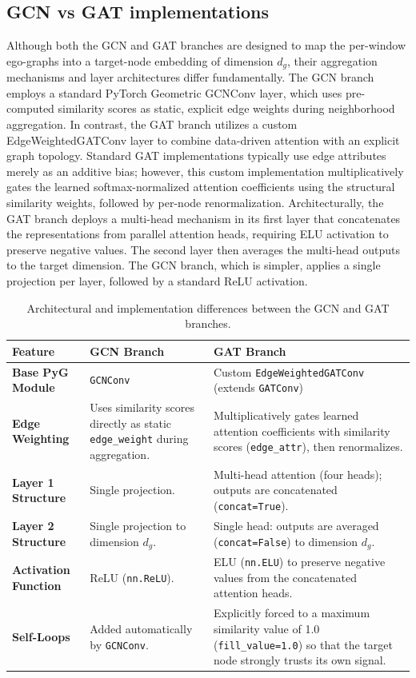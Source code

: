 \subsection{GCN vs GAT implementations}
Although both the GCN and GAT branches are designed to map the per-window ego-graphs into a target-node embedding of dimension $d_g$, their aggregation mechanisms and layer architectures differ fundamentally. The GCN branch employs a standard PyTorch Geometric GCNConv layer, which uses pre-computed similarity scores as static, explicit edge weights during neighborhood aggregation. In contrast, the GAT branch utilizes a custom EdgeWeightedGATConv layer to combine data-driven attention with an explicit graph topology. Standard GAT implementations typically use edge attributes merely as an additive bias; however, this custom implementation multiplicatively gates the learned softmax-normalized attention coefficients using the structural similarity weights, followed by per-node renormalization. Architecturally, the GAT branch deploys a multi-head mechanism in its first layer that concatenates the representations from parallel attention heads, requiring ELU activation to preserve negative values. The second layer then averages the multi-head outputs to the target dimension. The GCN branch, which is simpler, applies a single projection per layer, followed by a standard ReLU activation. 

\begin{table}[htpb]
\centering
\caption{Architectural and implementation differences between the GCN and GAT branches.}
\label{tab:gcn_vs_gat}
\begin{tabular}{@{} l p{5cm} p{6.5cm} @{}}
\toprule
\textbf{Feature} & \textbf{GCN Branch} & \textbf{GAT Branch} \\
\midrule
\textbf{Base PyG Module} & \texttt{GCNConv} & Custom \texttt{EdgeWeightedGATConv} (extends \texttt{GATConv}) \\
\addlinespace
\textbf{Edge Weighting} & Uses similarity scores directly as static \texttt{edge\_weight} during aggregation. & Multiplicatively gates learned attention coefficients with similarity scores (\texttt{edge\_attr}), then renormalizes. \\
\addlinespace
\textbf{Layer 1 Structure} & Single projection. & Multi-head attention (four heads); outputs are concatenated (\texttt{concat=True}). \\
\addlinespace
\textbf{Layer 2 Structure} & Single projection to dimension $d_g$. & Single head: outputs are averaged (\texttt{concat=False}) to dimension $d_g$. \\
\addlinespace
\textbf{Activation Function} & ReLU (\texttt{nn.ReLU}). & ELU (\texttt{nn.ELU}) to preserve negative values from the concatenated attention heads. \\
\addlinespace
\textbf{Self-Loops} & Added automatically by \texttt{GCNConv}. & Explicitly forced to a maximum similarity value of 1.0 (\texttt{fill\_value=1.0}) so that the target node strongly trusts its own signal. \\
\bottomrule
\end{tabular}
\end{table}

